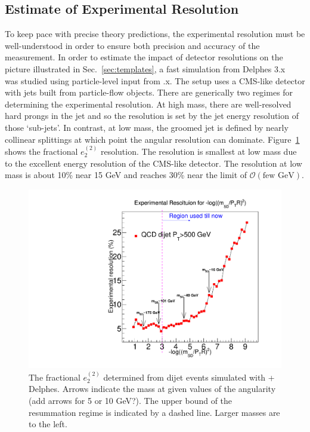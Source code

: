 \subsection{Estimate of Experimental Resolution}
\label{sec:resolution}

To keep pace with precise theory predictions, the experimental resolution must be well-understood in order to ensure both precision and accuracy of the measurement.  In order to estimate the impact of detector resolutions on the picture illustrated in Sec.~\ref{sec:templates}, a fast simulation from Delphes 3.x~\cite{deFavereau:2013fsa} was studied using particle-level input from \pythia.x.  The setup uses a CMS-like detector with jets built from particle-flow objects.  There are generically two regimes for determining the experimental resolution.  At high mass, there are well-resolved hard prongs in the jet and so the resolution is set by the jet energy resolution of those `sub-jets'.  In contrast, at low mass, the groomed jet is defined by nearly collinear splittings at which point the angular resolution can dominate.  Figure~\ref{fig:resolution} shows the fractional $e_2^{(2)}$ resolution.  The resolution is smallest at low mass due to the excellent energy resolution of the CMS-like detector.  The resolution at low mass is about 10\% near 15 GeV and reaches 30\% near the limit of $\mathcal{O}(\text{few GeV})$.  

\begin{figure}[h!]
\begin{center}
\includegraphics[width = 0.49\columnwidth]{figures/Experimental_Resolution_logrho.pdf}
\end{center}
\caption{The fractional $e_2^{(2)}$ determined from dijet events simulated with \pythia + Delphes.  Arrows indicate the mass at given values of the angularity (add arrows for 5 or 10 GeV?).  The upper bound of the resummation regime is indicated by a dashed line.  Larger masses are to the left.}
\label{fig:resolution}
\end{figure}

